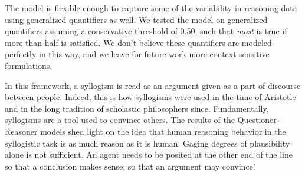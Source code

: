 \documentclass[10pt,letterpaper]{article}
\begin{document}
The model is flexible enough to capture some of the variability in reasoning data using generalized quantifiers as well. We tested the model on generalized quantifiers assuming a conservative threshold of 0.50, such that \emph{most} is true if more than half is satisfied. We don't believe these quantifiers are modeled perfectly in this way, and we leave for future work more context-sensitive formulations.

In this framework, a syllogism is read as an argument given as a part of discourse between people. Indeed, this is how syllogisms were used in the time of Aristotle and in the long tradition of scholastic philosophers since. Fundamentally, syllogisms are a tool used to convince others. The results of the Questioner-Reasoner models shed light on the idea that human reasoning behavior in the syllogistic task is as much reason as it is human. Gaging degrees of plausibility alone is not sufficient. An agent needs to be posited at the other end of the line so that a conclusion makes sense; so that an argument may convince!



\setlength{\bibleftmargin}{.125in}
\setlength{\bibindent}{-\bibleftmargin}


\end{document}
